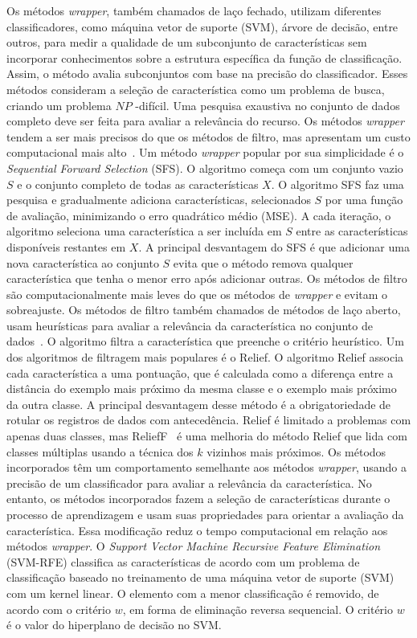 \documentclass{SBCbookchapter}
\begin{document}
Os métodos \textit{wrapper}, também chamados de laço fechado, utilizam diferentes classificadores, como máquina vetor de suporte (SVM), árvore de decisão, entre outros, para medir a qualidade de um subconjunto de características sem incorporar conhecimentos sobre a estrutura específica da função de classificação. Assim, o método avalia subconjuntos com base na precisão do classificador. Esses métodos consideram a seleção de característica como um problema de busca, criando um problema $NP$ -difícil. Uma pesquisa exaustiva no conjunto de dados completo deve ser feita para avaliar a relevância do recurso. Os métodos \textit{wrapper} tendem a ser mais precisos do que os métodos de filtro, mas apresentam um custo computacional mais alto~\cite{AndreoniLopez2019}. Um método \textit{wrapper} popular por sua simplicidade é o \textit{Sequential Forward Selection} (SFS). O algoritmo começa com um conjunto vazio $S$ e o conjunto completo de todas as características $X$. O algoritmo SFS faz uma pesquisa e gradualmente adiciona características, selecionados $ S $ por uma função de avaliação, minimizando o erro quadrático médio (MSE). A cada iteração, o algoritmo seleciona uma característica a ser incluída em $ S $ entre as características disponíveis restantes em $ X $. A principal desvantagem do SFS é que adicionar uma nova característica ao conjunto $ S $ evita que o método remova qualquer característica que tenha o menor erro após adicionar outras.
Os métodos de filtro são computacionalmente mais leves do que os métodos de \textit{wrapper} e evitam o sobreajuste. Os métodos de filtro também chamados de métodos de laço aberto, usam heurísticas para avaliar a relevância da característica no conjunto de dados~\cite{survey-features}. O algoritmo filtra a característica que preenche o critério heurístico. Um dos algoritmos de filtragem mais populares é o Relief. O algoritmo Relief associa cada característica a uma pontuação, que é calculada como a diferença entre a distância do exemplo mais próximo da mesma classe e o exemplo mais próximo da outra classe. A principal desvantagem desse método é a obrigatoriedade de rotular os registros de dados com antecedência. Relief é limitado a problemas com apenas duas classes, mas ReliefF~\cite{relif-comparison} é uma melhoria do método Relief que lida com classes múltiplas usando a técnica dos $ k $ vizinhos mais próximos.
Os métodos incorporados têm um comportamento semelhante aos métodos  \textit{wrapper}, usando a precisão de um classificador para avaliar a relevância da característica. No entanto, os métodos incorporados fazem a seleção de características durante o processo de aprendizagem e usam suas propriedades para orientar a avaliação da característica. Essa modificação reduz o tempo computacional em relação aos métodos \textit{wrapper}. O \textit{Support Vector Machine Recursive Feature Elimination} (SVM-RFE) classifica as características de acordo com um problema de classificação baseado no treinamento de uma máquina vetor de suporte (SVM) com um kernel linear. O elemento com a menor classificação é removido, de acordo com o critério $ w $, em forma de eliminação reversa sequencial. O critério $ w $ é o valor do hiperplano de decisão no SVM.
\end{document}
